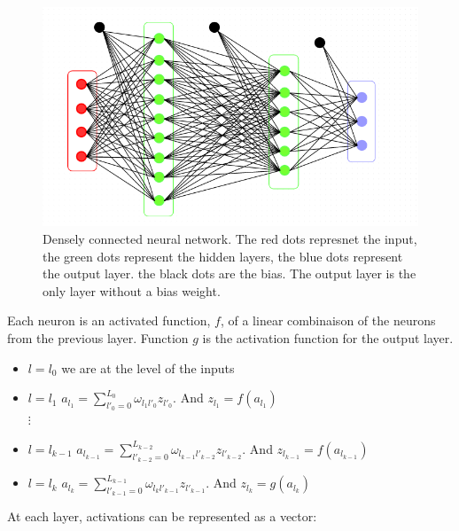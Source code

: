 \documentclass[final, paper=letter,5p,times,twocolumn]{elsarticle}
\begin{document}
\begin{figure}[htbp]
   \begin{center}
      \includegraphics[scale=0.3, angle=0]{images/densely_connected_nn.png}
   \end{center}
   \caption{Densely connected neural network. The red dots represnet the input, the green dots represent the hidden layers, the blue dots represent the output layer. the black dots are the bias. The output layer is the only layer without a bias weight.}
  \label{fig:Densely_connected_neural_network} 
\end{figure}

Each neuron is an activated function, $f$, of a linear combinaison of the neurons from the previous layer. Function $g$ is the activation function for the output layer.

\begin{itemize}
    \item $l = l_{0}$ we are at the level of the inputs
    \item $l = l_{1}$ $a_{l_{1}} = \sum_{l'_{0} = 0}^{L_{0}} \omega_{l_{1}l'_{0}} z_{l'_{0}}$. And $z_{l_{1}} = f(a_{l_{1}})$ \\
     $\vdots$
    \item $l = l_{k-1}$ $a_{l_{k-1}} = \sum_{l'_{k-2} = 0}^{L_{k-2}} \omega_{l_{k-1}l'_{k-2}} z_{l'_{k-2}}$. And $z_{l_{k-1}} = f(a_{l_{k-1}})$ \\ 
    \item $l = l_{k}$ $a_{l_{k}} = \sum_{l'_{k-1} = 0}^{L_{k-1}} \omega_{l_{k}l'_{k-1}} z_{l'_{k-1}}$. And $z_{l_{k}} = g(a_{l_{k}})$
\end{itemize}

At each layer, activations can be represented as a vector:
\end{document}
